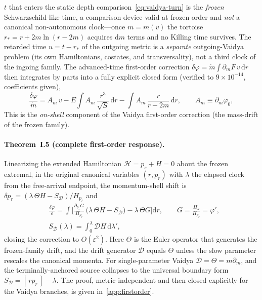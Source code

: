 \documentclass[12pt]{iopart}
\newcommand{\dd}{\mathrm{d}}
\begin{document}
$t$ that enters the static depth comparison~\eqref{eq:vaidya-turn} is the
\emph{frozen} Schwarzschild-like time, a comparison device valid at frozen order and
\emph{not} a canonical non-autonomous clock---once $m=m(v)$ the tortoise
$r_*=r+2m\ln(r-2m)$ acquires $\dd m$ terms and no Killing time survives. The retarded
time $u=t-r_*$ of the outgoing metric is a \emph{separate} outgoing-Vaidya problem
(its own Hamiltonians, costates, and transversality), not a third clock of the ingoing
family. The advanced-time first-order correction
$\delta\varphi=\dot m\!\int\!\partial_m F\,v\,\dd r$ then integrates by parts into a
fully explicit closed form (verified to $9\times10^{-14}$, coefficients given),
\begin{equation}
    \frac{\delta\varphi}{\dot m}
    =A_m\,v-E\!\int\! A_m\,\frac{r^3}{\sqrt S}\,\dd r
    -\int\! A_m\,\frac{r}{r-2m}\,\dd r,\qquad A_m\equiv\partial_m\varphi_0,
    \label{eq:vaidya-deltaphi}
\end{equation}
This is the \emph{on-shell} component of the Vaidya first-order correction (the
mass-drift of the frozen family).

\paragraph{Theorem~I.5 (complete first-order response).} Linearizing the extended
Hamiltonian $\mathcal H=p_s+H=0$ about the frozen extremal, in the original canonical
variables $(r,p_r)$ with $\lambda$ the elapsed clock from the free-arrival endpoint, the
momentum-shell shift is $\delta p_r=(\lambda\,\Theta H-S_{\mathcal D})/H_{p_r}$ and
\begin{equation}
    \begin{aligned}
    &\frac{\delta\varphi}{\varepsilon}=\int\!\Big[\frac{\partial_{p_r}G}{H_{p_r}}\,
    \big(\lambda\,\Theta H-S_{\mathcal D}\big)-\lambda\,\Theta G\Big]\dd r,\qquad
    G=\frac{H_J}{H_{p_r}}=\varphi',\\[2pt]
    &S_{\mathcal D}(\lambda)=\!\int_0^{\lambda}\!\mathcal D H\,\dd\lambda',
    \end{aligned}
    \label{eq:adiab-exact}
\end{equation}
closing the correction to $O(\varepsilon^2)$. Here $\Theta$ is the Euler operator that
generates the frozen-family drift, and the drift generator $\mathcal D$ equals $\Theta$
unless the slow parameter rescales the canonical momenta. For single-parameter Vaidya
$\mathcal D=\Theta=m\partial_m$, and the terminally-anchored source collapses to the
universal boundary form $S_{\mathcal D}=[\,rp_r\,]-\lambda$. The proof, metric-independent
and then closed explicitly for the Vaidya branches, is given in~\ref{app:firstorder}.
\end{document}
